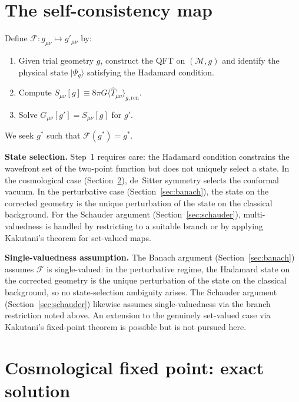 \documentclass[12pt,a4paper]{article}
\begin{document}
\section{The self-consistency map}
\label{sec:map}

Define $\mathcal{F}: g_{\mu\nu} \mapsto g'_{\mu\nu}$ by:
\begin{enumerate}
\item Given trial geometry $g$, construct the QFT on $(\mathcal{M},g)$ and identify the
physical state $|\Psi_g\rangle$ satisfying the Hadamard condition.
\item Compute $S_{\mu\nu}[g] \equiv 8\pi G\langle\hat{T}_{\mu\nu}\rangle_{g,\text{ren}}$.
\item Solve $G_{\mu\nu}[g'] = S_{\mu\nu}[g]$ for $g'$.
\end{enumerate}
We seek $g^*$ such that $\mathcal{F}(g^*) = g^*$.

\medskip\noindent\textbf{State selection.} Step~1 requires care: the Hadamard condition
constrains the wavefront set of the two-point function but does not uniquely select a
state. In the cosmological case (Section~\ref{sec:starobinsky}), de~Sitter symmetry
selects the conformal vacuum. In the perturbative case (Section~\ref{sec:banach}), the
state on the corrected geometry is the unique perturbation of the state on the classical
background. For the Schauder argument (Section~\ref{sec:schauder}), multi-valuedness is
handled by restricting to a suitable branch or by applying Kakutani's theorem for
set-valued maps.

\medskip\noindent\textbf{Single-valuedness assumption.} The Banach argument (Section~\ref{sec:banach}) assumes $\mathcal{F}$ is single-valued: in the perturbative regime, the Hadamard state on the corrected geometry is the unique perturbation of the state on the classical background, so no state-selection ambiguity arises. The Schauder argument (Section~\ref{sec:schauder}) likewise assumes single-valuedness via the branch restriction noted above. An extension to the genuinely set-valued case via Kakutani's fixed-point theorem is possible but is not pursued here.

\section{Cosmological fixed point: exact solution}
\label{sec:starobinsky}
\end{document}
